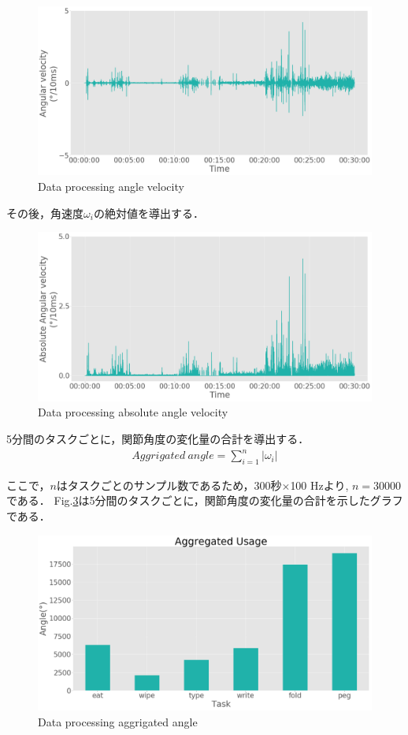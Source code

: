\begin{figure}[H]
  \centering
  \includegraphics[width=0.8\linewidth]{fig/velocity}
  \caption{Data processing angle velocity}
  \label{fig:angle_velocity}
\end{figure}

その後，角速度$\omega_i$の絶対値を導出する．

\begin{figure}[H]
  \centering
  \includegraphics[width=0.8\linewidth]{fig/absolute_velocity}
  \caption{Data processing absolute angle velocity}
  \label{fig:abs_velocity}
\end{figure}

5分間のタスクごとに，関節角度の変化量の合計を導出する．
\begin{eqnarray}
Aggrigated\ angle  = \sum_{i=1}^n |\omega_i|
\end{eqnarray}

ここで，$n$はタスクごとのサンプル数であるため，300秒$\times$100 Hzより,
$n=30000$である．
Fig.\ref{fig:agg_angle}は5分間のタスクごとに，関節角度の変化量の合計を示したグラフである．


\begin{figure}[H]
  \centering
  \includegraphics[width=0.8\linewidth]{fig/aggrigated_angle}
  \caption{Data processing aggrigated angle}
  \label{fig:agg_angle}
\end{figure}



